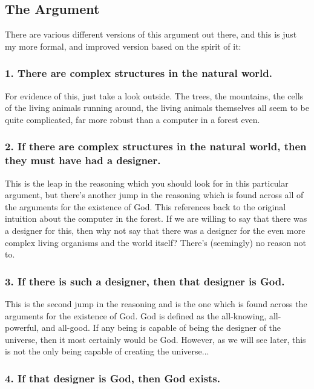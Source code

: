 \subsection{The Argument}
There are various different versions of this argument out there, and this is just my more formal, and improved version based on the spirit of it:

\subsubsection{1. There are complex structures in the natural world.}

For evidence of this, just take a look outside. The trees, the mountains, the cells of the living animals running around, the living animals themselves all seem to be quite complicated, far more robust than a computer in a forest even.

    \subsubsection{2. If there are complex structures in the natural world, then they must have had a designer.}

This is the leap in the reasoning which you should look for in this particular argument, but there's another jump in the reasoning which is found across all of the arguments for the existence of God. This references back to the original intuition about the computer in the forest. If we are willing to say that there was a designer for this, then why not say that there was a designer for the even more complex living organisms and the world itself? There's (seemingly) no reason not to. 

    \subsubsection{3. If there is such a designer, then that designer is God.}

This is the second jump in the reasoning and is the one which is found across the arguments for the existence of God. God is defined as the all-knowing, all-powerful, and all-good. If any being is capable of being the designer of the universe, then it most certainly would be God. However, as we will see later, this is not the only being capable of creating the universe... 

    \subsubsection{4. If that designer is God, then God exists.}

